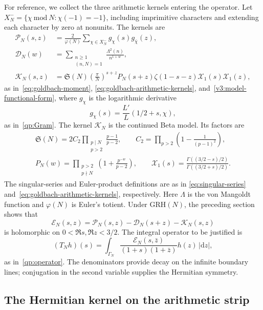 \documentclass[12pt,a4paper]{amsart}
\numberwithin{equation}{section}
\def\ge{\geqslant}
\theoremstyle{plain}
\theoremstyle{definition}
\theoremstyle{remark}
\begin{document}
For reference, we collect the three arithmetic kernels entering the operator.
Let $X_N^- = \{\chi\ \mathrm{mod}\ N:\chi(-1)=-1\}$, including imprimitive
characters and extending each character by zero at nonunits. The kernels are
\[
 \begin{aligned}
 \mathscr P_N(s,z)&=\frac2{\varphi(N)}
              \sum_{\chi\in X_N^-}g_\chi(s)g_{\bar\chi}(z),\\
 \mathscr D_N(w)&=\sum_{\substack{n\ge1\\(n,N)=1}}
                     \frac{\Lambda^2(n)}{n^{1+w}},\\
 \mathscr K_N(s,z)&=\mathfrak S(N)\left(\frac\pi N\right)^{s+z}
 P_N(s+z)\zeta(1-s-z)\mathcal X_1(s)\mathcal X_1(z),
 \end{aligned}
\]
as in~\eqref{eq:goldbach-moment}, \eqref{eq:goldbach-arithmetic-kernels}, and~\eqref{v3:model-functional-form},
where $g_\chi$ is the logarithmic derivative
\[
 g_\chi(s)=\frac{L'}L(1/2+s,\chi),
\]
as in~\eqref{qp:Gram}.
The kernel $\mathscr K_N$ is the continued Beta model. Its factors are
\[
 \begin{gathered}
 \mathfrak S(N)=2C_2\prod_{\substack{p\mid N\\p>2}}\frac{p-1}{p-2},
 \qquad C_2=\prod_{p>2}\left(1-\frac1{(p-1)^2}\right),\\
 P_N(w)=\prod_{\substack{p>2\\p\nmid N}}
          \left(1+\frac{p^{-w}}{p-2}\right),\qquad
 \mathcal X_1(s)=\frac{\Gamma((3/2-s)/2)}{\Gamma((3/2+s)/2)}.
 \end{gathered}
\]
The singular-series and Euler-product definitions are as in
\eqref{eq:singular-series} and~\eqref{eq:goldbach-arithmetic-kernels},
respectively. Here $\Lambda$ is the von Mangoldt function and $\varphi(N)$ is
Euler's totient. Under $\mathrm{GRH}(N)$, the preceding section
shows that
\[
 \mathscr E_N(s,z)=\mathscr P_N(s,z)
                  -\mathscr D_N(s+z)-\mathscr K_N(s,z)
\]
is holomorphic on $0<\Re s,\Re z<3/2$. The integral operator to
be justified is
\[
 (T_Nh)(s)=\int_{\Gamma_N}
       \frac{\mathscr E_N(s,\bar z)}{(1+s)(1+\bar z)}
       h(z)\,|\mathrm{d}z|,
\]
as in~\eqref{qp:operator}.
The denominators provide decay on the infinite boundary lines;
conjugation in the second variable supplies the Hermitian symmetry.

\subsection{The Hermitian kernel on the arithmetic strip}
\label{proof:v9:hermitian-kernel-section}
\end{document}

